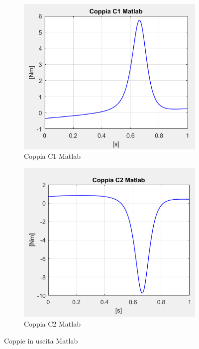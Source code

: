 \begin{figure}[!ht]
	\begin{subfigure}{.45\textwidth}
		\centering
		\includegraphics[width=.9\linewidth]{Immagini/Dinamica/c1matlab.png}  
		\caption{Coppia C1 Matlab}
		\label{fig:leggiC1M}
	\end{subfigure}
	\begin{subfigure}{.45\textwidth}
		\centering
		\includegraphics[width=.9\linewidth]{Immagini/Dinamica/c2matlab.png}  
		\caption{Coppia C2 Matlab}
		\label{fig:leggiC2M}
	\end{subfigure}
	\caption{Coppie in uscita Matlab}
\end{figure}
